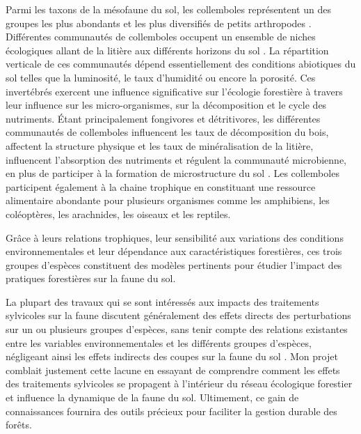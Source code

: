 Parmi les taxons de la mésofaune du sol, les collemboles représentent un des groupes les plus abondants et les plus diversifiés de petits arthropodes \citep{rusekBiodiversityCollembolaTheir1998}. 
Différentes communautés de collemboles occupent un ensemble de niches écologiques allant de la litière aux différents horizons du sol \citep{pongeVerticalDistributionCollembola2000}.
La répartition verticale de ces communautés dépend essentiellement des conditions abiotiques du sol telles que la luminosité, le taux d’humidité ou encore la porosité.
Ces invertébrés exercent une influence significative sur l'écologie forestière à travers leur influence sur les micro-organismes, sur la décomposition et le cycle des nutriments.
Étant principalement fongivores et détritivores, les différentes communautés de collemboles influencent les taux de décomposition du bois, affectent la structure physique et les taux de minéralisation de la litière, 
influencent l'absorption des nutriments et régulent la communauté microbienne, en plus de participer à la formation de microstructure du sol \citep{Petersen1982comparativeanalysis,Neher2012Linkinginvertebrate,Maass2015Functionalrole,Potapov2016Connectingtaxonomy}. 
Les collemboles participent également à la chaine trophique en constituant une ressource alimentaire abondante pour plusieurs organismes comme les amphibiens, les coléoptères, les arachnides, les oiseaux et les reptiles.

Grâce à leurs relations trophiques, leur sensibilité aux variations des conditions environnementales et leur dépendance aux caractéristiques forestières, ces trois groupes d'espèces constituent des modèles pertinents pour étudier l'impact des pratiques forestières sur la faune du sol. 

La plupart des travaux qui se sont intéressés aux impacts des traitements sylvicoles sur la faune discutent généralement des effets directs des perturbations sur un ou plusieurs groupes d'espèces, 
sans tenir compte des relations existantes entre les variables environnementales et les différents groupes d'espèces, 
négligeant ainsi les effets indirects des coupes sur la faune du sol \citep{josephIntegratingOccupancyModels2016,Pollierer2021Diversityfunctional,Kudrin2023metaanalysiseffects}. 
Mon projet comblait justement cette lacune en essayant de comprendre comment les effets des traitements sylvicoles se propagent à l’intérieur du réseau écologique forestier et influence la dynamique de la faune du sol.  
Ultimement, ce gain de connaissances fournira des outils précieux pour faciliter la gestion durable des forêts.


